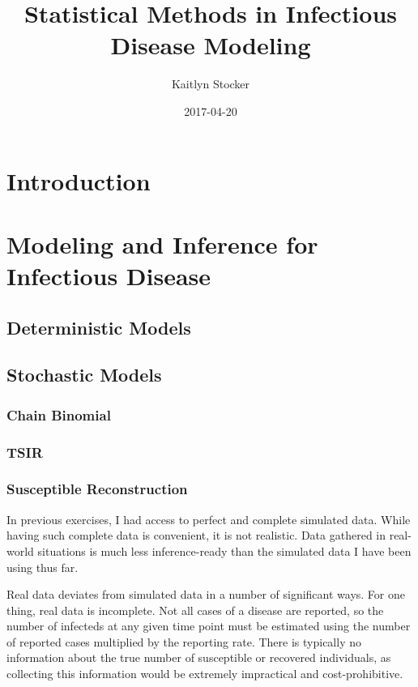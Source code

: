 \documentclass{article}
\title{Statistical Methods in Infectious Disease Modeling}
\date{2017-04-20}
\author{Kaitlyn Stocker}
\begin{document}
\maketitle
{}
\newpage
{}
\tableofcontents
\newpage

\section{Introduction}

\section{Modeling and Inference for Infectious Disease}
\subsection{Deterministic Models}
\subsection{Stochastic Models}
\subsubsection{Chain Binomial}
\subsubsection{TSIR}
\subsubsection{Susceptible Reconstruction}
In previous exercises, I had access to perfect and complete simulated data. While having such complete data is convenient, it is not realistic. Data gathered in real-world situations is much less inference-ready than the simulated data I have been using thus far.

Real data deviates from simulated data in a number of significant ways. For one thing, real data is incomplete. Not all cases of a disease are reported, so the number of infecteds at any given time point must be estimated using the number of reported cases multiplied by the reporting rate. There is typically no information about the true number of susceptible or recovered individuals, as collecting this information would be extremely impractical and cost-prohibitive. 
\end{document}
